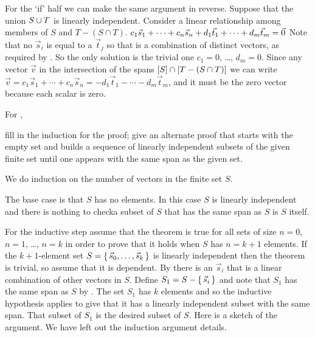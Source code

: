 \begin{exercises}
\begin{answer}
\begin{exparts}
          For the `if' half we can make the same argument in reverse.
          Suppose that the union $S\cup T$ is linearly independent.
          Consider a linear relationship among members of 
          $S$ and $T-(S\cap T)$.        
          $c_1\vec{s}_1+\cdots+c_n\vec{s}_n
            +d_1\vec{t}_1+\cdots+d_m\vec{t}_m
            =\vec{0}$
          Note that no $\vec{s}_i$ is equal to a $\vec{t}_j$
          so that is a combination of distinct vectors, as required by 
          .
          So the only solution 
          is the trivial one $c_1=0$, \ldots, $d_m=0$. 
          Since any vector $\vec{v}$ 
          in the intersection of the spans
          $\relax [S\relax ]\cap \relax [T-(S\cap T)\relax ]$ 
          we can write 
          $\vec{v}=c_1\vec{s}_1+\cdots+c_n\vec{s}_n
            =-d_1\vec{t}_1-\cdots-d_m\vec{t}_m$,
          and it must be the zero vector because each scalar is zero.
      \end{exparts}  
    \end{answer}
  \recommended \item \label{exer:FillIndDetProofSetHasLISub}
    For ,
    \begin{exparts}
       \partsitem fill in the induction for the proof;
       \partsitem give an alternate proof that starts with the empty
         set and builds
         a sequence of linearly independent subsets of the given finite set
         until one appears with the same span as the given set.
    \end{exparts}
    \begin{answer}
      \begin{exparts}
         \partsitem We do induction on the number of vectors in the finite set
           \( S \).

           The base case is that $S$ has no elements.
           In this case $S$ is linearly independent and there is nothing to 
           check\Dash a subset of $S$ that has the same span as $S$ is $S$
           itself.

           For the inductive step assume that the theorem is true for all 
           sets of size $n=0$, $n=1$, \ldots, $n=k$ 
           in order to prove that it holds when \( S \) has $n=k+1$ elements.
           If the $k+1$-element set \( S=\mbox{$\{\,\vec{s}_0,\dots,\vec{s}_{k}\,\}$} \) 
           is linearly independent then the theorem is trivial,
           so assume that it is dependent.
           By  there is an \( \vec{s}_i \)
           that is a linear combination of other vectors in \( S \).
           Define \( S_1=S-\mbox{$\{\,\vec{s}_i\,\}$} \) and note that 
           \( S_1 \) has the same span as \( S \) by
           .
           The set \( S_1 \) has \( k \) elements and 
           so the inductive hypothesis
           applies to give that it has a linearly independent subset with the 
           same span.
           That subset of \( S_1 \) is the desired subset of \( S \).
         \partsitem Here is a sketch of the argument.
           We have left out the induction argument details.


\end{exparts}
\end{answer}
\end{exercises}
